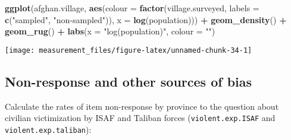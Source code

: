 \documentclass[]{book}
\newenvironment{Shaded}{\begin{snugshade}}{\end{snugshade}}
\newcommand{\CommentTok}[1]{\textcolor[rgb]{0.56,0.35,0.01}{\textit{#1}}}
\newcommand{\DataTypeTok}[1]{\textcolor[rgb]{0.13,0.29,0.53}{#1}}
\newcommand{\KeywordTok}[1]{\textcolor[rgb]{0.13,0.29,0.53}{\textbf{#1}}}
\newcommand{\NormalTok}[1]{#1}
\newcommand{\OperatorTok}[1]{\textcolor[rgb]{0.81,0.36,0.00}{\textbf{#1}}}
\newcommand{\StringTok}[1]{\textcolor[rgb]{0.31,0.60,0.02}{#1}}
\theoremstyle{definition}
\theoremstyle{definition}
\theoremstyle{definition}
\theoremstyle{remark}
\begin{document}
\begin{Shaded}
\begin{Highlighting}[]
\KeywordTok{ggplot}\NormalTok{(afghan.village, }\KeywordTok{aes}\NormalTok{(}\DataTypeTok{colour =} \KeywordTok{factor}\NormalTok{(village.surveyed,}
                                      \DataTypeTok{labels =} \KeywordTok{c}\NormalTok{(}\StringTok{"sampled"}\NormalTok{, }\StringTok{"non-sampled"}\NormalTok{)),}
                           \DataTypeTok{x =} \KeywordTok{log}\NormalTok{(population))) }\OperatorTok{+}
\StringTok{  }\KeywordTok{geom_density}\NormalTok{() }\OperatorTok{+}
\StringTok{  }\KeywordTok{geom_rug}\NormalTok{() }\OperatorTok{+}
\StringTok{  }\KeywordTok{labs}\NormalTok{(}\DataTypeTok{x =} \StringTok{"log(population)"}\NormalTok{, }\DataTypeTok{colour =} \StringTok{""}\NormalTok{)}
\end{Highlighting}
\end{Shaded}

\begin{center}\texttt{[image: measurement\_files/figure-latex/unnamed-chunk-34-1]} \end{center}

\hypertarget{non-response-and-other-sources-of-bias}{%
\subsection{Non-response and other sources of
bias}\label{non-response-and-other-sources-of-bias}}

Calculate the rates of item non-response by province to the question
about civilian victimization by ISAF and Taliban forces
(\texttt{violent.exp.ISAF} and \texttt{violent.exp.taliban}):

\begin{Shaded}
\end{Shaded}
\end{document}
